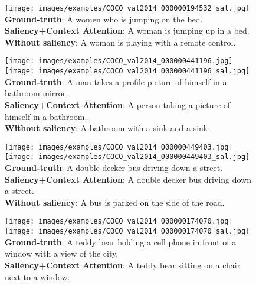 \begin{figure}[t]
\begin{center}
\begin{minipage}[t]{0.32\linewidth}
    \texttt{[image: images/examples/COCO\_val2014\_000000194532\_sal.jpg]}  
    \scriptsize{
        \textbf{Ground-truth}: A women who is jumping on the bed. \\
        \textbf{Saliency+Context Attention}: A woman is jumping up in a bed. \\
        \textbf{Without saliency}: A woman is playing with a remote control. \\
    }
    \end{minipage}
    \hspace{0.02cm}
    \begin{minipage}[t]{0.32\linewidth}
    \texttt{[image: images/examples/COCO\_val2014\_000000441196.jpg]}  
    \texttt{[image: images/examples/COCO\_val2014\_000000441196\_sal.jpg]}  
    \scriptsize{
        \textbf{Ground-truth}: A man takes a profile picture of himself in a bathroom mirror. \\
        \textbf{Saliency+Context Attention}: A person taking a picture of himself in a bathroom. \\
        \textbf{Without saliency}: A bathroom with a sink and a sink. \\
    }
    \end{minipage}
    \hspace{0.02cm}
    \begin{minipage}[t]{0.32\linewidth}
    \texttt{[image: images/examples/COCO\_val2014\_000000449403.jpg]}  
    \texttt{[image: images/examples/COCO\_val2014\_000000449403\_sal.jpg]}  
    \scriptsize{
        \textbf{Ground-truth}: A double decker bus driving down a street. \\
        \textbf{Saliency+Context Attention}: A double decker bus driving down a street. \\
        \textbf{Without saliency}: A bus is parked on the side of the road. \\
    }
    \end{minipage}
    \begin{minipage}[t]{0.32\linewidth}
    \texttt{[image: images/examples/COCO\_val2014\_000000174070.jpg]} 
    \texttt{[image: images/examples/COCO\_val2014\_000000174070\_sal.jpg]}  
    \scriptsize{
        \textbf{Ground-truth}: A teddy bear holding a cell phone in front of a window with a view of the city. \\
        \textbf{Saliency+Context Attention}: A teddy bear sitting on a chair next to a window. \\
}
\end{minipage}
\end{center}
\end{figure}
